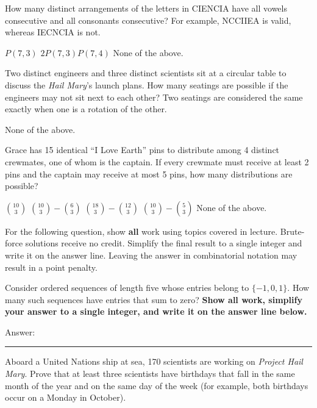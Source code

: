 \documentclass[11pt,addpoints]{exam}
\newcommand{\practiceWorkSpace}{\par\vspace{0.85in}}
\begin{document}
\begin{questions}
\question[5] How many distinct arrangements of the letters in \textsc{CIENCIA} have all vowels consecutive and all consonants consecutive? For example, \textsc{NCCIIEA} is valid, whereas \textsc{IECNCIA} is not.
\begin{choices}
    \choice $P(7,3)$
    \choice $2P(7,3)P(7,4)$
    \choice None of the above.
\end{choices}
\practiceWorkSpace

\question[5] Two distinct engineers and three distinct scientists sit at a circular table to discuss the \textit{Hail Mary}'s launch plans. How many seatings are possible if the engineers may not sit next to each other? Two seatings are considered the same exactly when one is a rotation of the other.
\begin{choices}
    \choice None of the above.
\end{choices}
\practiceWorkSpace

\question[5] Grace has 15 identical ``I Love Earth'' pins to distribute among 4 distinct crewmates, one of whom is the captain. If every crewmate must receive at least 2 pins and the captain may receive at most 5 pins, how many distributions are possible?
\begin{choices}
    \choice $\binom{10}{3}$
    \choice $\binom{10}{3}-\binom{6}{3}$
    \choice $\binom{18}{3}-\binom{12}{3}$
    \choice $\binom{10}{3}-\binom{5}{3}$
    \choice None of the above.
\end{choices}
\practiceWorkSpace

\newpage
For the following question, show \textbf{all} work using topics covered in lecture. Brute-force solutions receive no credit. Simplify the final result to a single integer and write it on the answer line. Leaving the answer in combinatorial notation may result in a point penalty.

\question[12] Consider ordered sequences of length five whose entries belong to $\{-1,0,1\}$. How many such sequences have entries that sum to zero? \textbf{Show all work, simplify your answer to a single integer, and write it on the answer line below.}

Answer: \rule{4cm}{0.15mm} \hspace{1cm}

\newpage
\question[16] Aboard a United Nations ship at sea, 170 scientists are working on \textit{Project Hail Mary}. Prove that at least three scientists have birthdays that fall in the same month of the year and on the same day of the week (for example, both birthdays occur on a Monday in October).


\end{questions}
\end{document}
